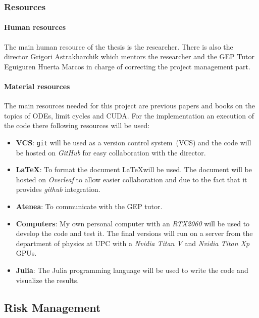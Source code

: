 \pagebreak
\subsubsection{Resources}

\paragraph{Human resources}

The main human resource of the thesis is the researcher.  There is also the
director Grigori Astrakharchik which mentors the researcher and the GEP Tutor
Eguiguren Huerta Marcos in charge of correcting the project management part.

\paragraph{Material resources}

The main resources needed for this project are previous papers and books on the
topics of ODEs, limit cycles and CUDA. For the implementation an execution of
the code there following resources will be used:

\begin{itemize}
    \item \textbf{VCS}: \texttt{git} will be used as a version control
        system~(VCS) and the code will be hosted on \emph{GitHub} for easy
        collaboration with the director.
    \item \textbf{\LaTeX}: To format the document \LaTeX will be used. The
        document will be hosted on \emph{Overleaf} to allow easier collaboration
        and due to the fact that it provides \emph{github} integration.
    \item \textbf{Atenea}: To communicate with the GEP tutor.
    \item \textbf{Computers}: My own personal computer with an \emph{RTX2060} will be
        used to develop the code and test it. The final versions will run
        on a server from the department of physics at UPC with a \emph{Nvidia
        Titan V} and \emph{Nvidia Titan Xp} GPUs.
    \item \textbf{Julia}: The Julia programming language will be used to write
        the code and visualize the results.
\end{itemize}



\subsection{Risk Management}

